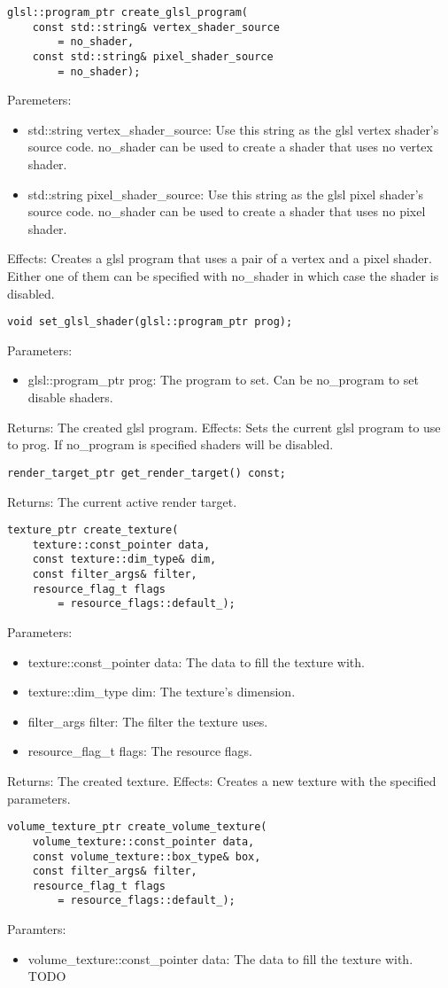 \documentclass{article}
\begin{document}
\begin{lstlisting}
glsl::program_ptr create_glsl_program(
	const std::string& vertex_shader_source
		= no_shader,
	const std::string& pixel_shader_source
		= no_shader);
\end{lstlisting}
Paremeters:
\begin{itemize}
\item std::string vertex\_shader\_source: Use this string as the glsl vertex shader's source code.
no\_shader can be used to create a shader that uses no vertex shader.
\item std::string pixel\_shader\_source: Use this string as the glsl pixel shader's source code.
no\_shader can be used to create a shader that uses no pixel shader.
\end{itemize}
Effects: Creates a glsl program that uses a pair of a vertex and a pixel shader.
Either one of them can be specified with no\_shader in which case the shader is disabled.

\begin{lstlisting}
void set_glsl_shader(glsl::program_ptr prog);
\end{lstlisting}
Parameters:
\begin{itemize}
\item glsl::program\_ptr prog: The program to set. Can be no\_program to set disable shaders.
\end{itemize}
Returns: The created glsl program.
Effects: Sets the current glsl program to use to prog. If no\_program is specified shaders will be disabled.

\begin{lstlisting}
render_target_ptr get_render_target() const;
\end{lstlisting}
Returns: The current active render target.

\begin{lstlisting}
texture_ptr create_texture(
	texture::const_pointer data,
	const texture::dim_type& dim,
	const filter_args& filter,
	resource_flag_t flags
		= resource_flags::default_);
\end{lstlisting}
Parameters:
\begin{itemize}
\item texture::const\_pointer data: The data to fill the texture with.
\item texture::dim\_type dim: The texture's dimension.
\item filter\_args filter: The filter the texture uses.
\item resource\_flag\_t flags: The resource flags.
\end{itemize}
Returns: The created texture.
Effects: Creates a new texture with the specified parameters.

\begin{lstlisting}
volume_texture_ptr create_volume_texture(
	volume_texture::const_pointer data,
	const volume_texture::box_type& box,
	const filter_args& filter,
	resource_flag_t flags
		= resource_flags::default_);
\end{lstlisting}
Paramters:
\begin{itemize}
\item volume\_texture::const\_pointer data: The data to fill the texture with.
TODO
\end{itemize}
\end{document}
